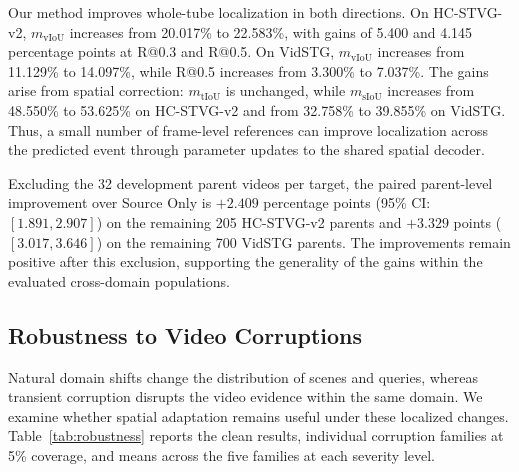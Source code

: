 \documentclass[10pt,twocolumn,letterpaper]{article}
\newcommand{\mvIoU}{\ensuremath{m_{\mathrm{vIoU}}}}
\newcommand{\mtIoU}{\ensuremath{m_{\mathrm{tIoU}}}}
\newcommand{\msIoU}{\ensuremath{m_{\mathrm{sIoU}}}}
\begin{document}
Our method improves whole-tube localization in both directions.
On HC-STVG-v2, \mvIoU{} increases from 20.017\% to 22.583\%,
with gains of 5.400 and 4.145 percentage points at R@0.3
and R@0.5. On VidSTG, \mvIoU{} increases from 11.129\%
to 14.097\%, while R@0.5 increases from 3.300\% to 7.037\%.
The gains arise from spatial correction: \mtIoU{} is unchanged,
while \msIoU{} increases from 48.550\% to 53.625\% on
HC-STVG-v2 and from 32.758\% to 39.855\% on VidSTG.
Thus, a small number of frame-level references can improve
localization across the predicted event through parameter
updates to the shared spatial decoder.

Excluding the 32 development parent videos per target,
the paired parent-level improvement over Source Only is
$+2.409$ percentage points (95\% CI: $[1.891,2.907]$)
on the remaining 205 HC-STVG-v2 parents and $+3.329$
points ($[3.017,3.646]$) on the remaining 700 VidSTG
parents. The improvements remain positive after this
exclusion, supporting the generality of the gains within
the evaluated cross-domain populations.

\subsection{Robustness to Video Corruptions}
\label{sec:robustness}

Natural domain shifts change the distribution of scenes
and queries, whereas transient corruption disrupts the
video evidence within the same domain. We examine whether
spatial adaptation remains useful under these localized
changes. Table~\ref{tab:robustness} reports the clean
results, individual corruption families at 5\% coverage,
and means across the five families at each severity level.
\end{document}
